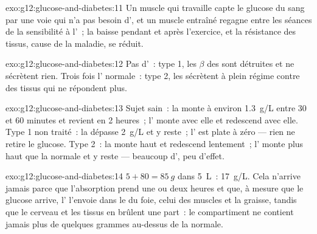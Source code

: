\begin{solution}{exo:g12:glucose-and-diabetes:11}
Un muscle qui travaille capte le glucose du sang par une voie qui n'a
pas besoin d', et un muscle entraîné regagne entre les séances
de la sensibilité à l'~; la  baisse pendant et après
l'exercice, et la résistance des tissus, cause de la maladie, se
réduit.
\end{solution}

\begin{solution}{exo:g12:glucose-and-diabetes:12}
Pas d'~: type 1, les  $\beta$ des  sont détruites
et ne sécrètent rien. Trois fois l' normale~: type 2, les
 sécrètent à plein régime contre des tissus qui ne répondent
plus.
\end{solution}

\begin{solution}{exo:g12:glucose-and-diabetes:13}
Sujet sain~: la  monte à environ \qty{1.3}{g/L} entre 30 et 60
minutes et revient en 2 heures~; l' monte avec elle et
redescend avec elle. Type 1 non traité~: la  dépasse
\qty{2}{g/L} et y reste~; l' est plate à zéro --- rien ne
retire le glucose. Type 2~: la  monte haut et redescend
lentement~; l' monte plus haut que la normale et y
reste --- beaucoup d', peu d'effet.
\end{solution}

\begin{solution}{exo:g12:glucose-and-diabetes:14}
$5 + 80 = \qty{85}{g}$ dans \qty{5}{L}~: \qty{17}{g/L}. Cela n'arrive
jamais parce que l'absorption prend une ou deux heures et que, à
mesure que le glucose arrive, l' l'envoie dans le  du
foie, celui des muscles et la graisse, tandis que le cerveau et les
tissus en brûlent une part~: le compartiment ne contient jamais plus
de quelques grammes au-dessus de la normale.
\end{solution}

